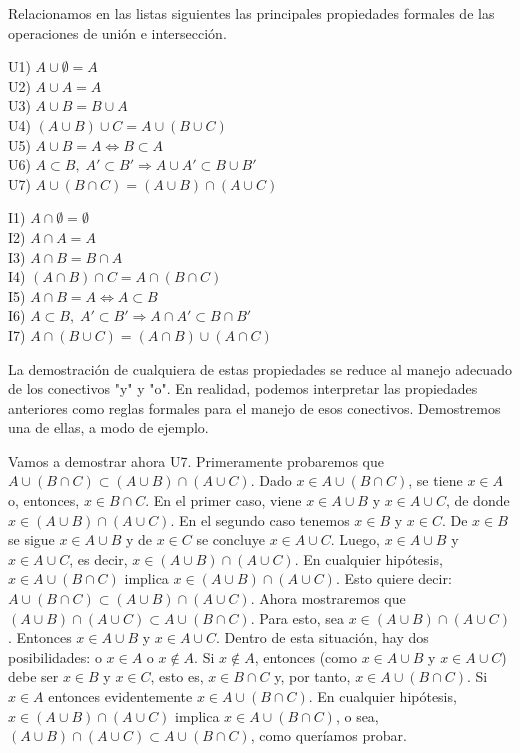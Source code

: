 Relacionamos en las listas siguientes las principales propiedades formales de las operaciones de unión e intersección.

U1) \(A \cup \emptyset = A\)  \\
U2) \(A \cup A = A\)  \\
U3) \(A \cup B = B \cup A\)  \\
U4) \((A \cup B) \cup C = A \cup (B \cup C)\)  \\
U5) \(A \cup B = A \iff B \subset A\)  \\
U6) \(A \subset B,\; A' \subset B' \Rightarrow A \cup A' \subset B \cup B'\)  \\
U7) \(A \cup (B \cap C) = (A \cup B) \cap (A \cup C)\)

I1) \(A \cap \emptyset = \emptyset\)  \\
I2) \(A \cap A = A\)  \\
I3) \(A \cap B = B \cap A\)  \\
I4) \((A \cap B) \cap C = A \cap (B \cap C)\)  \\
I5) \(A \cap B = A \iff A \subset B\)  \\
I6) \(A \subset B,\; A' \subset B' \Rightarrow A \cap A' \subset B \cap B'\)  \\
I7) \(A \cap (B \cup C) = (A \cap B) \cup (A \cap C)\)

La demostración de cualquiera de estas propiedades se reduce al manejo adecuado de los conectivos "y" y "o". En realidad, podemos interpretar las propiedades anteriores como reglas formales para el manejo de esos conectivos. Demostremos una de ellas, a modo de ejemplo.

Vamos a demostrar ahora U7. Primeramente probaremos que \(A \cup (B \cap C) \subset (A \cup B) \cap (A \cup C)\). Dado \(x \in A \cup (B \cap C)\), se tiene \(x \in A\) o, entonces, \(x \in B \cap C\). En el primer caso, viene \(x \in A \cup B\) y \(x \in A \cup C\), de donde \(x \in (A \cup B) \cap (A \cup C)\). En el segundo caso tenemos \(x \in B\) y \(x \in C\). De \(x \in B\) se sigue \(x \in A \cup B\) y de \(x \in C\) se concluye \(x \in A \cup C\). Luego, \(x \in A \cup B\) y \(x \in A \cup C\), es decir, \(x \in (A \cup B) \cap (A \cup C)\). En cualquier hipótesis, \(x \in A \cup (B \cap C)\) implica \(x \in (A \cup B) \cap (A \cup C)\). Esto quiere decir: \(A \cup (B \cap C) \subset (A \cup B) \cap (A \cup C)\). Ahora mostraremos que \((A \cup B) \cap (A \cup C) \subset A \cup (B \cap C)\). Para esto, sea \(x \in (A \cup B) \cap (A \cup C)\). Entonces \(x \in A \cup B\) y \(x \in A \cup C\). Dentro de esta situación, hay dos posibilidades: o \(x \in A\) o \(x \notin A\). Si \(x \notin A\), entonces (como \(x \in A \cup B\) y \(x \in A \cup C\)) debe ser \(x \in B\) y \(x \in C\), esto es, \(x \in B \cap C\) y, por tanto, \(x \in A \cup (B \cap C)\). Si \(x \in A\) entonces evidentemente \(x \in A \cup (B \cap C)\). En cualquier hipótesis, \(x \in (A \cup B) \cap (A \cup C)\) implica \(x \in A \cup (B \cap C)\), o sea, \((A \cup B) \cap (A \cup C) \subset A \cup (B \cap C)\), como queríamos probar.

